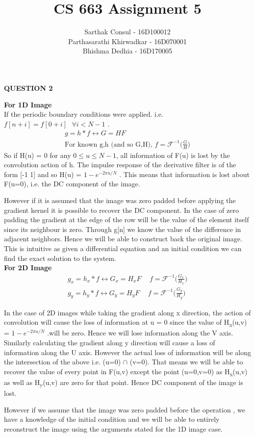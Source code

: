 \documentclass{article}
\title{CS 663 Assignment 5}
\author{Sarthak Consul - 16D100012\\
Parthasarathi Khirwadkar - 16D070001\\
Bhishma Dedhia - 16D170005}
\date{}
\begin{document}
\maketitle
\centerline{\textbf{\large\large{{{QUESTION 2}}}}}
\textbf{For 1D Image}\\
If the periodic boundary conditions were applied. i.e. $f[n+i] = f[0+i] \hspace{8pt}\forall i<N-1$
. 
\begin{align*}
    g = h*f \longleftrightarrow G = HF\\
    \text{For known g,h (and so G,H), }f = \mathscr{F}^{-1}\bigg(\frac{G}{H}\bigg)
\end{align*}
So if H(u) = 0 for any $0\leq u \leq N-1$, all information of F(u) is lost by the convolution action of h. The impulse response of the derivative filter is of the form [-1 1]  and so H(u) = $1 - e^{-2\pi u/N }$ . This means that information is lost about F(u=0), i.e. the DC component of the image. 

However if it is assumed that the image was zero padded before applying the gradient kernel it is possible to recover the DC component. In the case of zero padding the gradient at the edge of the row will be the value of the element itself since its neighbour is zero. Through g[n] we know the value of the difference in adjacent neighbors. Hence we will be able to construct back the original image. This is intuitive as given a differential equation and an initial condition we can find the exact solution to the system.\\

\textbf{For 2D Image}\\
\begin{align*}
    g_x = h_x*f \longleftrightarrow G_x = H_x F \hspace{15pt} f = \mathscr{F}^{-1}\bigg(\frac{G_x}{H_x}\bigg)\\
    g_y = h_y*f \longleftrightarrow G_y = H_y F \hspace{15pt} f = \mathscr{F}^{-1}\bigg(\frac{G_y}{H_y}\bigg)
\end{align*}

In the case of 2D images while taking the gradient along x direction, the action of convolution will cause the loss of information at u = 0 since the value of H\textsubscript{x}(u,v) =  $1 - e^{-2\pi u/N }$ .will be zero. Hence we will lose information along the V axis. Similarly calculating the gradient along y direction will cause a loss of information along the U axis. However the actual loss of information will be along the intersection of the above i.e. (u=0) $\cap$ (v=0). That means we will be able to recover the value of every point in F(u,v) except the point (u=0,v=0) as H\textsubscript{x}(u,v) as well as H\textsubscript{y}(u,v) are zero for that point. Hence DC component of the image is lost.

However if we assume that the image was zero padded before the operation , we have a knowledge of the initial condition and we will be able to entirely reconstruct the image using the arguments stated for the 1D image case.
\end{document}
